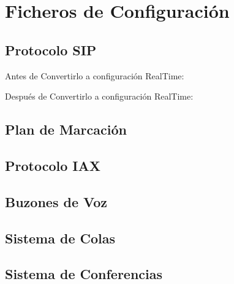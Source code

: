 
\section*{Ficheros de Configuración}

\subsection*{Protocolo SIP}

Antes de Convertirlo a configuración RealTime:



Después de Convertirlo a configuración RealTime:



\subsection*{Plan de Marcación}



\subsection*{Protocolo IAX}



\subsection*{Buzones de Voz}



\subsection*{Sistema de Colas}



\subsection*{Sistema de Conferencias}

